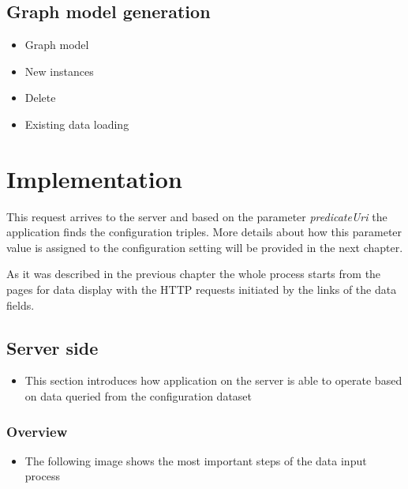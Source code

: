 


\subsection{Graph model generation}  \label{513}


\begin{itemize}	
	\item{Graph model}
	\item{New instances}
	\item{Delete}
	\item{Existing data loading}
\end{itemize}


\section{Implementation} \label{52}


This request arrives to the server and based on the parameter \textit{predicateUri} the application finds the configuration triples. More details about how this parameter value is assigned to the configuration setting will be provided in the next chapter.

As it was described in the previous chapter the whole process starts from the pages for data display with the HTTP requests initiated by the links of the data fields. 



\subsection{Server side} 

\begin{itemize}
	\item This section introduces how application on the server is able to operate based on data queried from the configuration dataset
	
\end{itemize}

\subsubsection{Overview}

\begin{itemize}
	\item The following image shows the most important steps of the data input process
\end{itemize}

